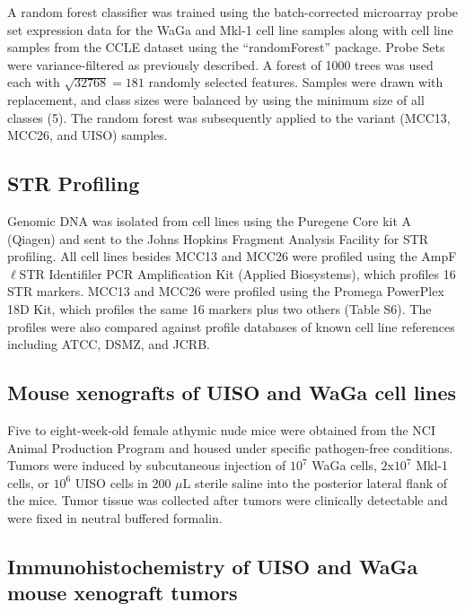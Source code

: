 \documentclass[10pt]{article}
\begin{document}
A random forest classifier was trained using the batch-corrected microarray probe set expression data for the WaGa and Mkl-1 cell line samples along with cell line samples from the CCLE dataset using the ``randomForest'' package.
Probe Sets were variance-filtered as previously described.
A forest of 1000 trees was used each with $\sqrt{32768}=181$ randomly selected features.
Samples were drawn with replacement, and class sizes were balanced by using the minimum size of all classes (5).
The random forest was subsequently applied to the variant (MCC13, MCC26, and UISO) samples.

\subsection*{STR Profiling}

Genomic DNA was isolated from cell lines using the Puregene Core kit A (Qiagen) and sent to the Johns Hopkins Fragment Analysis Facility for STR profiling.
All cell lines besides MCC13 and MCC26 were profiled using the AmpF$\ell$STR Identifiler PCR Amplification Kit (Applied Biosystems), which profiles 16 STR markers.
MCC13 and MCC26 were profiled using the Promega PowerPlex 18D Kit, which profiles the same 16 markers plus two others (Table S6).
The profiles were also compared against profile databases of known cell line references including ATCC, DSMZ, and JCRB.

\subsection*{Mouse xenografts of UISO and WaGa cell lines}

Five to eight-week-old female athymic nude mice were obtained from the NCI Animal Production Program and housed under specific pathogen-free conditions.
Tumors were induced by subcutaneous injection of $10^7$ WaGa cells, $2\mathrm{x}10^7$ Mkl-1 cells, or $10^6$ UISO cells in 200 $\mu\mathrm{L}$ sterile saline into the posterior lateral flank of the mice.
Tumor tissue was collected after tumors were clinically detectable and were fixed in neutral buffered formalin.

\subsection*{Immunohistochemistry of UISO and WaGa mouse xenograft tumors}
\end{document}
